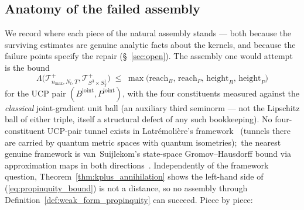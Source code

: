 \documentclass[11pt,a4paper]{article}
\theoremstyle{plain}
\theoremstyle{definition}
\newcommand{\nmax}{n_{\max}}
\newcommand{\Nt}{N_{t}}
\newcommand{\Manifold}{S^{3}\times S^{1}_{T}}
\newcommand{\Tcal}{\mathcal{T}}
\newcommand{\Lambdab}{\Lambda}
\newcommand{\Bjoint}{B^{\mathrm{joint}}}
\newcommand{\Pjoint}{P^{\mathrm{joint}}}
\begin{document}
\subsection{Anatomy of the failed assembly}\label{sec:withdrawn_assembly}

We record where each piece of the natural assembly stands — both
because the surviving estimates are genuine analytic facts about the
kernels, and because the failure points specify the repair
(\S~\ref{sec:open}). The assembly one would attempt is the bound
\begin{equation}\label{eq:propinquity_bound}
   \Lambdab\bigl(\Tcal^{+}_{\nmax,\Nt,T}, \Tcal^{+}_{\Manifold}\bigr)
   \;\le\; \max\bigl(\mathrm{reach}_{B},\,
                       \mathrm{reach}_{P},\,
                       \mathrm{height}_{B},\,
                       \mathrm{height}_{P}\bigr)
\end{equation}
for the UCP pair $(\Bjoint, \Pjoint)$, with the four constituents
measured against the \emph{classical} joint-gradient unit ball (an
auxiliary third seminorm — not the Lipschitz ball of either triple,
itself a structural defect of any such bookkeeping). No
four-constituent UCP-pair tunnel exists in Latr\'emoli\`ere's
framework~\cite{latremoliere_metric_st_2017} (tunnels there are
carried by quantum metric spaces with quantum isometries);\ the
nearest genuine framework is van~Suijlekom's state-space
Gromov--Hausdorff bound via approximation maps in both
directions~\cite{vs2021_jgp,leimbach_vs2024}. Independently of the
framework question, Theorem~\ref{thm:kplus_annihilation} shows the
left-hand side of (\ref{eq:propinquity_bound}) is not a distance, so
no assembly through Definition~\ref{def:weak_form_propinquity} can
succeed.\label{prop:reach_height} Piece by piece:
\end{document}
